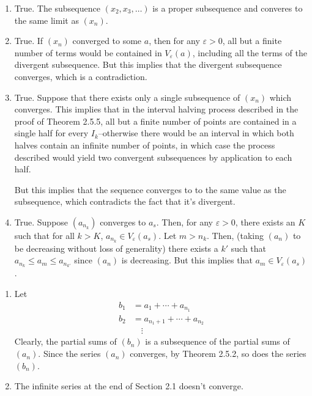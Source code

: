 \documentclass[a4paper]{report}
\newenvironment{ex}[1]
    {\noindent{\large \bf Exercise #1.}}{\vspace{0.5cm}}
\begin{document}
\begin{ex}{2.5.2}
  \begin{enumerate}[label=\alph*)]
  \item True. The subsequence $(x_2, x_3, \dots)$ is a proper subsequence and converes to the same
    limit as $(x_n)$.
  \item True. If $(x_n)$ converged to some $a$, then for any
    $\varepsilon > 0$, all but a finite number of terms would be
    contained in $V_\varepsilon(a)$, including all the terms of the
    divergent subsequence. But this implies that the divergent
    subsequence converges, which is a contradiction.
  \item True. Suppose that there exists only a single subsequence of
    $(x_n)$ which converges. This implies that in the interval halving
    process described in the proof of Theorem 2.5.5, all but a finite
    number of points are contained in a single half for every
    $I_k$--otherwise there would be an interval in which both halves
    contain an infinite number of points, in which case the process
    described would yield two convergent subsequences by application
    to each half.

    But this implies that the sequence converges to to the same value as the subsequence,
    which contradicts the fact that it's divergent.

  \item True. Suppose $(a_{n_k})$ converges to $a_s$. Then, for any
    $\varepsilon > 0$, there exists an $K$ such that for all $k > K$,
    $a_{n_k} \in V_{\varepsilon}(a_s)$. Let $m > n_k$. Then, (taking
    $(a_n)$ to be decreasing without loss of generality) there exists
    a $k'$ such that $a_{n_k} \leq a_m \leq a_{n_{k'}}$ since $(a_n)$ is decreasing.
    But this implies that $a_m \in V_\varepsilon(a_s)$.
  \end{enumerate}
\end{ex}

\begin{ex}{2.5.3}
  \begin{enumerate}[label=\alph*)]
  \item Let
    \begin{align*}
      b_1 &= a_1 + \cdots + a_{n_1} \\
      b_2 &= a_{n_1 + 1} + \cdots + a_{n_2} \\
          &\quad\vdots
    \end{align*}
    Clearly, the partial sums of $(b_n)$ is a subsequence of the partial sums of $(a_n)$. Since the
    series $(a_n)$ converges, by Theorem 2.5.2, so does the series $(b_n)$.
  \item The infinite series at the end of Section 2.1 doesn't converge.
  \end{enumerate}
\end{ex}
\end{document}
